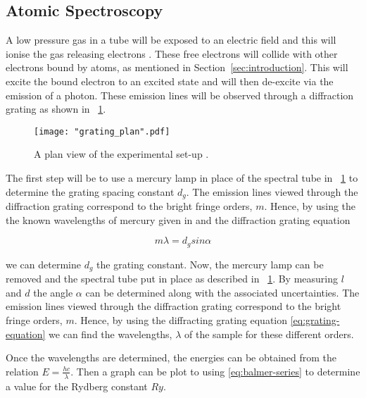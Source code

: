 \documentclass{article}
\newcommand{\figref}[2][\figurename~]{#1\ref{#2}}
\newcommand{\secref}[2][Section~]{#1\ref{#2}}
\begin{document}
\subsection{Atomic Spectroscopy}
\label{ssec:atomic-method}
A low pressure gas in a tube will be exposed to an electric field and this will ionise the gas releasing electrons \cite{Paper01}. These free electrons will collide with other electrons bound by atoms, as mentioned in \secref{sec:introduction}. This will excite the bound electron to an excited state and will then de-excite via the emission of a photon. These emission lines will be observed through a diffraction grating as shown in \figref{fig:grating_plan}.

\begin{figure}[h]
\centering
\texttt{[image: "grating\_plan".pdf]}
\caption{A plan view of the experimental set-up \cite{Paper01}.}
\label{fig:grating_plan}
\end{figure}

\vspace{2mm}
\noindent
The first step will be to use a mercury lamp in place of the spectral tube in \figref{fig:grating_plan} to determine the grating spacing constant $d_g$. The emission lines viewed through the diffraction grating correspond to the bright fringe orders, $m$. Hence, by using the the known wavelengths of mercury given in \cite{Paper01} and the diffraction grating equation 

\begin{equation}
\label{eq:grating-equation}
m\lambda = d_gsin\alpha
\end{equation}

\vspace{2mm}
\noindent
we can determine $d_g$ the grating constant. Now, the mercury lamp can be removed and the spectral tube put in place as described in \figref{fig:grating_plan}. By measuring $l$ and $d$ the angle $\alpha$ can be determined along with the associated uncertainties. The emission lines viewed through the diffraction grating correspond to the bright fringe orders, $m$. Hence, by using the diffracting grating equation \eqref{eq:grating-equation} we can find the wavelengths, $\lambda$ of the sample for these different orders.

\vspace{2mm}
\noindent
Once the wavelengths are determined, the energies can be obtained from the relation $E = \frac{hc}{\lambda}$. Then a graph can be plot to using \eqref{eq:balmer-series} to determine a value for the Rydberg constant $Ry$.
\end{document}
